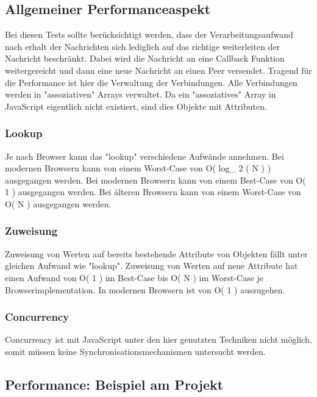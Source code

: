 \subsection{Allgemeiner Performanceaspekt} \label{associativearray}
Bei diesen Tests sollte berücksichtigt werden, dass der Verarbeitungsaufwand nach erhalt der Nachrichten sich lediglich auf das richtige weiterleiten der Nachricht beschränkt. 
Dabei wird die Nachricht an eine Callback Funktion weitergereicht und dann eine neue Nachricht an einen Peer versendet. 
Tragend für die Performance ist hier die Verwaltung der Verbindungen.
Alle Verbindungen werden in "assoziativen" Arrays verwaltet. Da ein "assoziatives" Array in JavaScript eigentlich nicht existiert, sind dies Objekte mit Attributen. 



\subsubsection{Lookup}
Je nach Browser kann das "lookup" verschiedene Aufwände annehmen.
Bei modernen Browsern kann von einem Worst-Case von \mathcal O\left( log_{ 2 }\left( N \right) \right) ausgegangen werden.
Bei modernen Browsern kann von einem Best-Case von \mathcal O\left( 1 \right) ausgegangen werden.
Bei älteren Browsern kann von einem Worst-Case von \mathcal O\left( N \right) ausgegangen werden.



\subsubsection{Zuweisung}
Zuweisung von Werten auf bereits bestehende Attribute von Objekten fällt unter gleichen Aufwand wie "lookup".
Zuweisung von Werten auf neue Attribute hat einen Aufwand von \mathcal O\left( 1 \right) im Best-Case bis \mathcal O\left( N \right) im Worst-Case je Browserimplementation. In modernen Browsern ist von \mathcal O\left( 1 \right) auszugehen.



\subsubsection{Concurrency}
Concurrency ist mit JavaScript unter den hier genutzten Techniken nicht möglich, somit müssen keine Synchronisationsmechanismen untersucht werden.




\subsection{Performance: Beispiel am Projekt}

